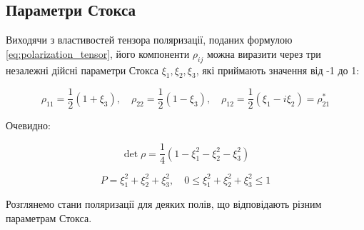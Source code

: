\subsection{Параметри Стокса}

Виходячи з властивостей тензора поляризації, поданих формулою \eqref{eq:polarization_tensor}, його компоненти \(\rho_{ij}\) можна виразити через три
незалежні дійсні параметри Стокса \(\xi_1, \xi_2, \xi_3\), які приймають значення від -1 до 1:

\begin{equation*}
\rho_{11} = \frac{1}{2} \left( 1 + \xi_3 \right), \quad \rho_{22} = \frac{1}{2} \left( 1 - \xi_3 \right), \quad \rho_{12} = \frac{1}{2} \left( \xi_1 -
i\xi_2 \right) = \rho_{21}^{*}
\end{equation*}

Очевидно:

\begin{equation*}
\det \rho = \frac{1}{4} \left( 1 - \xi_1^2 - \xi_2^2 - \xi_3^2 \right)
\end{equation*}

\begin{equation*}
P = \xi_1^2 + \xi_2^2 + \xi_3^2, \quad 0 \leq \xi_1^2 + \xi_2^2 + \xi_3^2 \leq 1
\end{equation*}

Розглянемо стани поляризації для деяких полів, що відповідають різним параметрам Стокса.

